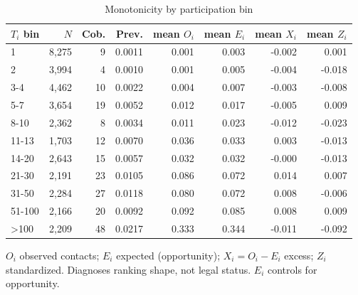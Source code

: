\begin{table}[htbp]\centering\footnotesize
\caption{Monotonicity by participation bin}
\label{tab:monotonicity_bins}
\begin{tabular}{lrrrrrrr}\hline
$T_i$ bin & $N$ & Cob. & Prev. & mean $O_i$ & mean $E_i$ & mean $X_i$ & mean $Z_i$ \\\hline
1 & 8,275 &  9 & 0.0011 & 0.001 & 0.003 & -0.002 & 0.001 \\
2 & 3,994 &  4 & 0.0010 & 0.001 & 0.005 & -0.004 & -0.018 \\
3-4 & 4,462 & 10 & 0.0022 & 0.004 & 0.007 & -0.003 & -0.008 \\
5-7 & 3,654 & 19 & 0.0052 & 0.012 & 0.017 & -0.005 & 0.009 \\
8-10 & 2,362 &  8 & 0.0034 & 0.011 & 0.023 & -0.012 & -0.023 \\
11-13 & 1,703 & 12 & 0.0070 & 0.036 & 0.033 & 0.003 & -0.013 \\
14-20 & 2,643 & 15 & 0.0057 & 0.032 & 0.032 & -0.000 & -0.013 \\
21-30 & 2,191 & 23 & 0.0105 & 0.086 & 0.072 & 0.014 & 0.007 \\
31-50 & 2,284 & 27 & 0.0118 & 0.080 & 0.072 & 0.008 & -0.006 \\
51-100 & 2,166 & 20 & 0.0092 & 0.092 & 0.085 & 0.008 & 0.009 \\
>100 & 2,209 & 48 & 0.0217 & 0.333 & 0.344 & -0.011 & -0.092 \\
\hline\end{tabular}
\begin{tablenotes}\footnotesize\item $O_i$ observed contacts; $E_i$ expected (opportunity); $X_i=O_i-E_i$ excess; $Z_i$ standardized. Diagnoses ranking shape, not legal status. $E_i$ controls for opportunity.\end{tablenotes}
\end{table}
